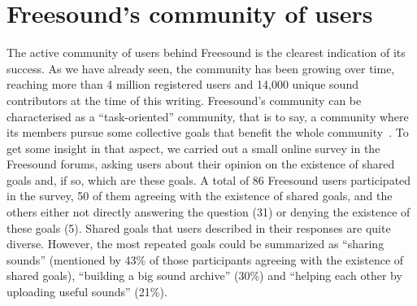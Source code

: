 

\section{Freesound's community of users}
\label{sec:app:survey}


The active community of users behind Freesound is the clearest indication of its success.
As we have already seen, the community has been growing over time, reaching more than 4 million registered users and 14,000 unique sound contributors at the time of this writing.
Freesound's community can be characterised as a ``task-oriented'' community, that is to say, a community where its members pursue some collective goals that benefit the whole community~\citep{Stanoevska-slabeva2002a}. 
To get some insight in that aspect, we carried out a small online survey in the Freesound forums, asking users about their opinion on the existence of shared goals and, if so, which are these goals.
A total of 86 Freesound users participated in the survey, 50 of them agreeing with the existence of shared goals, and the others either not directly answering the question (31) or denying the existence of these goals (5).
Shared goals that users described in their responses are quite diverse. However, the most repeated goals could be summarized as ``sharing sounds'' (mentioned by 43\% of those participants agreeing with the existence of shared goals), ``building a big sound archive'' (30\%) and ``helping each other by uploading useful sounds'' (21\%).

